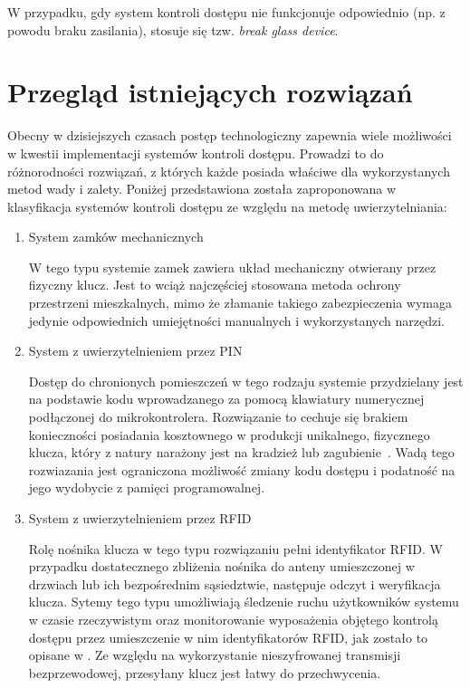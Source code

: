 		W przypadku, gdy system kontroli dostępu nie funkcjonuje odpowiednio (np. z powodu braku zasilania), stosuje się tzw. \textit{break glass device}.

	\section{Przegląd istniejących rozwiązań}

		Obecny w dzisiejszych czasach postęp technologiczny zapewnia wiele możliwości w kwestii implementacji systemów kontroli dostępu. Prowadzi to do różnorodności rozwiązań, z których każde posiada właściwe dla wykorzystanych metod wady i zalety. Poniżej przedstawiona została zaproponowana w \cite{access-system-survey} klasyfikacja systemów kontroli dostępu ze względu na metodę uwierzytelniania:
		\begin{enumerate}[label=\Alph*.]
			\item System zamków mechanicznych

				W tego typu systemie zamek zawiera układ mechaniczny otwierany przez fizyczny klucz. Jest to wciąż najczęściej stosowana metoda ochrony przestrzeni mieszkalnych, mimo że złamanie takiego zabezpieczenia wymaga jedynie odpowiednich umiejętności manualnych i wykorzystanych narzędzi.

			\item System z uwierzytelnieniem przez PIN

				Dostęp do chronionych pomieszczeń w tego rodzaju systemie przydzielany jest na podstawie kodu wprowadzanego za pomocą klawiatury numerycznej podłączonej do mikrokontrolera. Rozwiązanie to cechuje się brakiem konieczności posiadania kosztownego w produkcji unikalnego, fizycznego klucza, który z natury narażony jest na kradzież lub zagubienie~\cite{keypad-access-system}. Wadą tego rozwiazania jest ograniczona możliwość zmiany kodu dostępu i podatność na jego wydobycie z pamięci programowalnej.

			\item System z uwierzytelnieniem przez RFID

				Rolę nośnika klucza w tego typu rozwiązaniu pełni identyfikator RFID. W przypadku dostatecznego zbliżenia nośnika do anteny umieszczonej w drzwiach lub ich bezpośrednim sąsiedztwie, następuje odczyt i weryfikacja klucza. Sytemy tego typu umożliwiają śledzenie ruchu użytkowników systemu w czasie rzeczywistym oraz monitorowanie wyposażenia objętego kontrolą dostępu przez umieszczenie w nim identyfikatorów RFID, jak zostało to opisane w \cite{rfid-access-system-for-university}. Ze względu na wykorzystanie nieszyfrowanej transmisji bezprzewodowej, przesyłany klucz jest łatwy do przechwycenia.


\end{enumerate}
